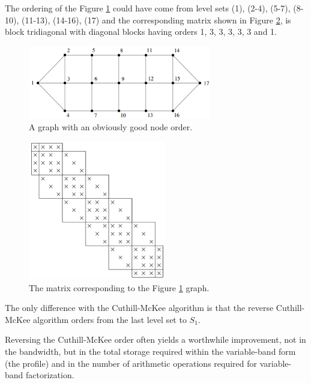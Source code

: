 \begin{exm}
  The ordering of the Figure \ref{fig:CMcase} could have come from
  level sets (1), (2-4), (5-7), (8-10), (11-13), (14-16), (17) and the
  corresponding matrix shown in Figure \ref{fig:CMcaseMatrix}, is
  block tridiagonal with diagonal blocks having orders 1, 3, 3, 3, 3, 3
  and 1.

  \begin{figure}[H]
    \centering
    \includegraphics[width=8cm]{png/CMcase.png}
    \caption{A graph with an obviously good node order.}
    \label{fig:CMcase}
  \end{figure}
  \begin{figure}[H]
    \centering
    \includegraphics[width=6cm]{png/CMcaseMatrix.png}
    \caption{The matrix corresponding to the Figure \ref{fig:CMcase}
      graph.}
    \label{fig:CMcaseMatrix}
  \end{figure}
\end{exm}

\begin{alg}
 The only difference with the Cuthill-McKee algorithm is that the
 reverse Cuthill-McKee algorithm orders from the last level set to $S_1$.  
\end{alg}

\begin{rmk}
  Reversing the Cuthill-McKee order often yields a  worthwhile
  improvement, not in the bandwidth, but in the total storage required
  within the variable-band form (the profile) and in the number of
  arithmetic operations required for variable-band factorization. 
\end{rmk}

